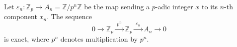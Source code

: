 Let $\varepsilon_n: \mathbb{Z}_p \rightarrow A_n = \mathbb{Z}/p^n\mathbb{Z}$ be the map sending a $p$-adic integer $x$ to its $n$-th component $x_n$. The sequence
$$0 \longrightarrow \mathbb{Z}_p \xrightarrow{\;p^n\;} \mathbb{Z}_p \xrightarrow{\;\varepsilon_n\;} A_n \longrightarrow 0$$
is exact, where $p^n$ denotes multiplication by $p^n$.
